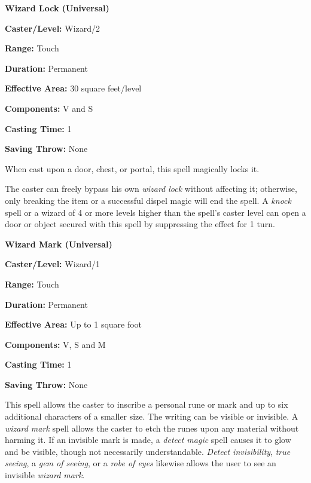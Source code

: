 \begin{multicols}{2}
\vspace{1em}

\noindent
\begin{minipage}{\columnwidth}

\noindent \textbf{Wizard Lock (Universal)}

\noindent \textbf{Caster/Level:} Wizard/2

\noindent \textbf{Range:} Touch

\noindent \textbf{Duration:} Permanent

\noindent \textbf{Effective Area:} 30 square feet/level

\noindent \textbf{Components:} V and S

\noindent \textbf{Casting Time:} 1

\noindent \textbf{Saving Throw:} None

\end{minipage}

When cast upon a door, chest, or portal, this spell magically locks it.  

The caster can freely bypass his own \textit{wizard lock} without affecting it; otherwise, only breaking the item or a successful dispel magic will end the spell.  A \textit{knock} spell or a wizard of 4 or more levels higher than the spell's caster level can open a door or object secured with this spell by suppressing the effect for 1 turn.

\vspace{1em}

\noindent
\begin{minipage}{\columnwidth}

\noindent \textbf{Wizard Mark (Universal)}

\noindent \textbf{Caster/Level:} Wizard/1

\noindent \textbf{Range:} Touch

\noindent \textbf{Duration:} Permanent

\noindent \textbf{Effective Area:} Up to 1 square foot

\noindent \textbf{Components:} V, S and M

\noindent \textbf{Casting Time:} 1

\noindent \textbf{Saving Throw:} None

\end{minipage}

This spell allows the caster to inscribe a personal rune or mark and up to six additional characters of a smaller size.  The writing can be visible or invisible.  A \textit{wizard mark} spell allows the caster to etch the runes upon any material without harming it.  If an invisible mark is made, a \textit{detect magic} spell causes it to glow and be visible, though not necessarily understandable.  \textit{Detect invisibility}, \textit{true seeing}, a \textit{gem of seeing}, or a \textit{robe of eyes} likewise allows the user to see an invisible \textit{wizard mark}.  


\end{multicols}
